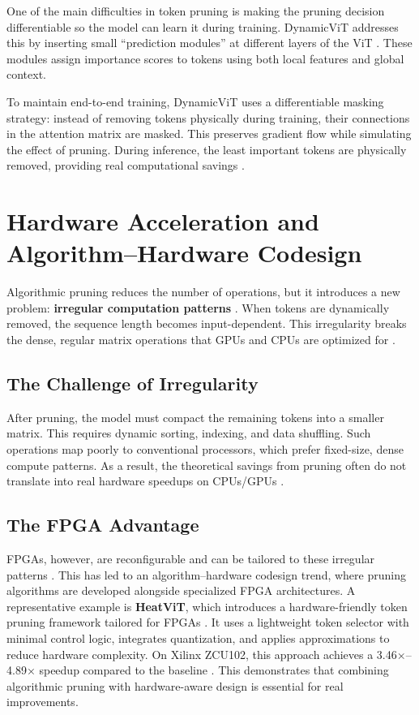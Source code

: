 One of the main difficulties in token pruning is making the pruning decision differentiable so the model can learn it during training. DynamicViT addresses this by inserting small “prediction modules” at different layers of the ViT \cite{ref3}. These modules assign importance scores to tokens using both local features and global context.

To maintain end-to-end training, DynamicViT uses a differentiable masking strategy:  
instead of removing tokens physically during training, their connections in the attention matrix are masked. This preserves gradient flow while simulating the effect of pruning. During inference, the least important tokens are physically removed, providing real computational savings \cite{ref3}.

\section{Hardware Acceleration and Algorithm–Hardware Codesign}

Algorithmic pruning reduces the number of operations, but it introduces a new problem: \textbf{irregular computation patterns} \cite{ref3}. When tokens are dynamically removed, the sequence length becomes input-dependent. This irregularity breaks the dense, regular matrix operations that GPUs and CPUs are optimized for \cite{ref4}.

\subsection{The Challenge of Irregularity}
After pruning, the model must compact the remaining tokens into a smaller matrix. This requires dynamic sorting, indexing, and data shuffling. Such operations map poorly to conventional processors, which prefer fixed-size, dense compute patterns. As a result, the theoretical savings from pruning often do not translate into real hardware speedups on CPUs/GPUs \cite{ref5}.

\subsection{The FPGA Advantage}
FPGAs, however, are reconfigurable and can be tailored to these irregular patterns \cite{ref12}. This has led to an algorithm–hardware codesign trend, where pruning algorithms are developed alongside specialized FPGA architectures. A representative example is \textbf{HeatViT}, which introduces a hardware-friendly token pruning framework tailored for FPGAs \cite{ref4}. It uses a lightweight token selector with minimal control logic, integrates quantization, and applies approximations to reduce hardware complexity. On Xilinx ZCU102, this approach achieves a 3.46×–4.89× speedup compared to the baseline \cite{ref4}. This demonstrates that combining algorithmic pruning with hardware-aware design is essential for real improvements.

